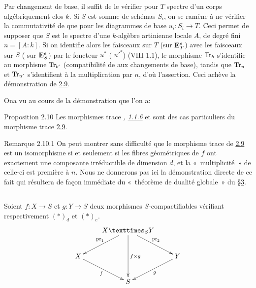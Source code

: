 \documentclass[10pt]{../fichiers-configuration-latex/smfart}
\begin{document}
Par changement de base, il suffit de le vérifier pour $T$ spectre d'un
corps algébriquement clos $k$. Si $S$ est somme de schémas $S_{i}$, on
se ramène à ne vérifier la commutativité de  que pour les
diagrammes  de base $u_{i}:S_{i}\rightarrow T$. Ceci permet de
supposer que $S$ est le spectre d'une $k$-algèbre artinienne locale
$A$, de degré fini $n=[A:k]$. Si on identifie alors les faisceaux sur
$T$ (\resp sur $\mathbf{E}^{e}_{T}$) avec les faisceaux sur $S$ (\resp
sur $\mathbf{E}^{e}_{S}$) par le foncteur $u^{\ast}$ (\resp
${u'}^{\ast}$) (VIII 1.1), le morphisme $\operatorname{Tr}_{b}$ s'identifie au
morphisme $\operatorname{Tr}_{b'}$ (compatibilité de  aux changements de
base), tandis que $\operatorname{Tr}_{u}$ et $\operatorname{Tr}_{u'}$ s'identifient à la
multiplication par $n$, d'où l'assertion. Ceci achève la démonstration
de \hyperref[XVIII.thm2.9]{2.9}.

On\pageoriginale a vu au cours de la démonstration que l'on a:

\begin{enonce*}{Proposition 2.10}
Les morphismes trace \emph{,
  \hyperref[XVIII.prop1.1.6]{1.1.6}} et  sont des cas
  particuliers du morphisme trace \hyperref[XVIII.thm2.9]{2.9}.
\end{enonce*}

\begin{enonce*}[remark]{Remarque 2.10.1}
On peut montrer sans difficulté que le morphisme trace de
\hyperref[XVIII.thm2.9]{2.9} est un 
isomorphisme si et seulement si les fibres géométriques de $f$ ont
exactement une composante irréductible de dimension $d$, et la « multiplicité »  de celle-ci est première à $n$. Nous ne donnerons
pas ici la démonstration directe de ce fait qui résultera de façon
immédiate du « théorème de dualité globale »  du \S \hyperref[XVIII.sec3]{3}.
\end{enonce*}

\setcounter{subsection}{10}
\subsection{}
Soient $f:X\rightarrow S$ et $g:Y\rightarrow S$ deux morphismes
$S$-compactifiables vérifiant respectivement $(\ast)_{d}$ et
$(\ast)_{e}$.
$$
\xymatrix{
     & \fprod{X}{Y}{S} \ar[dd]^{f\times g}\ar[ld]_{\pr_1}\ar[rd]^{\pr_2} & \\
X\ar[rd]_{f} &                                        & Y\ar[ld]^{g} \\ 
             &    S                                   &
}
$$
\end{document}

